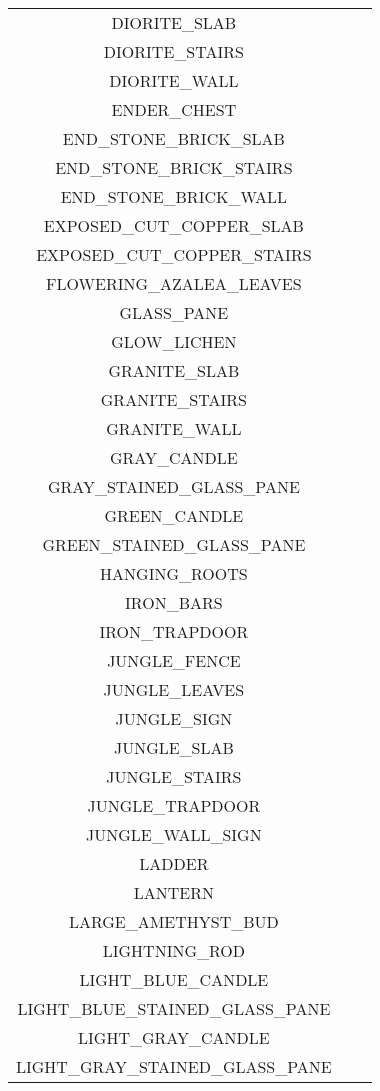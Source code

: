 \documentclass[11pt]{article}
\newcommand{\xmark}{\ding{55}}%
\begin{document}
\begin{longtable}{ |c|c|c| }
	DIORITE\_SLAB & \xmark \\
	DIORITE\_STAIRS & \xmark \\
	DIORITE\_WALL & \xmark \\
	ENDER\_CHEST & \xmark \\
	END\_STONE\_BRICK\_SLAB & \xmark \\
	END\_STONE\_BRICK\_STAIRS & \xmark \\
	END\_STONE\_BRICK\_WALL & \xmark \\
	EXPOSED\_CUT\_COPPER\_SLAB & \xmark \\
	EXPOSED\_CUT\_COPPER\_STAIRS & \xmark \\
	FLOWERING\_AZALEA\_LEAVES & \xmark \\
	GLASS\_PANE & \xmark \\
	GLOW\_LICHEN & \xmark \\
	GRANITE\_SLAB & \xmark \\
	GRANITE\_STAIRS & \xmark \\
	GRANITE\_WALL & \xmark \\
	GRAY\_CANDLE & \xmark \\
	GRAY\_STAINED\_GLASS\_PANE & \xmark \\
	GREEN\_CANDLE & \xmark \\
	GREEN\_STAINED\_GLASS\_PANE & \xmark \\
	HANGING\_ROOTS & \xmark \\
	IRON\_BARS & \xmark \\
	IRON\_TRAPDOOR & \xmark \\
	JUNGLE\_FENCE & \xmark \\
	JUNGLE\_LEAVES & \xmark \\
	JUNGLE\_SIGN & \xmark \\
	JUNGLE\_SLAB & \xmark \\
	JUNGLE\_STAIRS & \xmark \\
	JUNGLE\_TRAPDOOR & \xmark \\
	JUNGLE\_WALL\_SIGN & \xmark \\
	LADDER & \xmark \\
	LANTERN & \xmark \\
	LARGE\_AMETHYST\_BUD & \xmark \\
	LIGHTNING\_ROD & \xmark \\
	LIGHT\_BLUE\_CANDLE & \xmark \\
	LIGHT\_BLUE\_STAINED\_GLASS\_PANE & \xmark \\
	LIGHT\_GRAY\_CANDLE & \xmark \\
	LIGHT\_GRAY\_STAINED\_GLASS\_PANE & \xmark \\

\end{longtable}
\end{document}
